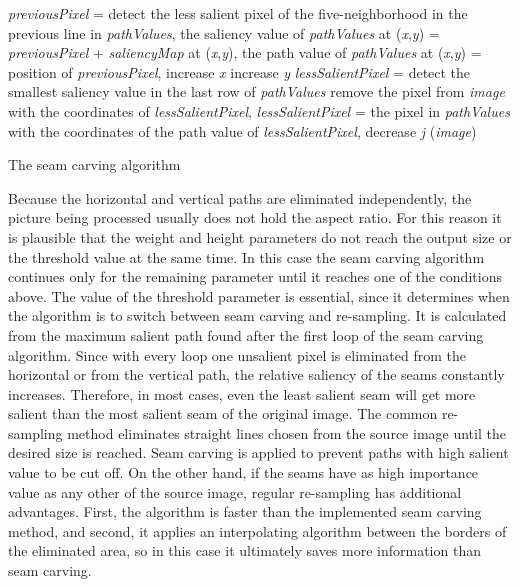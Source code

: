 \documentclass[draft,final]{vutinfth} %
\begin{document}
	\begin{algorithm}
		{
			{
				\textit{previousPixel} = detect the less salient pixel of the five-neighborhood in the previous line in \textit{pathValues},
				the saliency value of \textit{pathValues} at (\textit{x},\textit{y}) = \textit{previousPixel} + \textit{saliencyMap} at (\textit{x},\textit{y}),
				the path value of \textit{pathValues} at (\textit{x},\textit{y}) = position of  \textit{previousPixel},
				increase \textit{x}
			}
				increase \textit{y}	
		}
		\textit{lessSalientPixel} = detect the smallest saliency value in the last row of \textit{pathValues}
		{
			remove the pixel from \textit{image} with the coordinates of \textit{lessSalientPixel},
			\textit{lessSalientPixel} = the pixel in \textit{pathValues} with the coordinates of the path value of \textit{lessSalientPixel},
			decrease \textit{j} 
		}
		\Return(\textit{image})
		\caption{The seam carving algorithm}
		\label{alg:seamCarving}
	\end{algorithm}

	Because the horizontal and vertical paths are eliminated independently, the picture being processed usually does not hold the aspect ratio.
	For this reason it is plausible that the weight and height parameters do not reach the output size or the threshold value at the same time.
	In this case the seam carving algorithm continues only for the remaining parameter until it reaches one of the conditions above. 
    The value of the threshold parameter is essential,	since it determines when the algorithm is to switch between seam carving and re-sampling. 
	It is calculated from the maximum salient path found after the first loop of the seam carving algorithm.
	Since with every loop one unsalient pixel is eliminated from the horizontal or from the vertical path, the relative saliency of the seams constantly increases.
	Therefore, in most cases, even the least salient seam will get more salient than the most salient seam of the original image. 
	The common re-sampling method eliminates straight lines chosen from the source image until the desired size is reached.
	Seam carving is applied to prevent paths with high salient value to be cut off.
	On the other hand, if the seams have as high importance value as any other of the source image, regular re-sampling has additional advantages.
	First, the algorithm is faster than the implemented seam carving method, and second, it applies an interpolating algorithm between the borders of the eliminated area, so in this case it ultimately saves more information than seam carving.   
	
\end{document}
